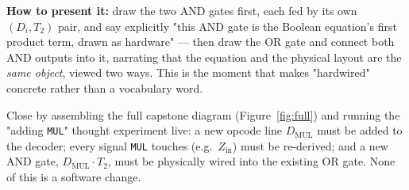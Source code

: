 \documentclass[11pt]{article}
\begin{document}
\textbf{How to present it:} draw the two AND gates first, each fed by its own $(D_i, T_2)$ pair, and say explicitly "this AND gate is the Boolean equation's first product term, drawn as hardware" --- then draw the OR gate and connect both AND outputs into it, narrating that the equation and the physical layout are the \emph{same object}, viewed two ways. This is the moment that makes "hardwired" concrete rather than a vocabulary word.

Close by assembling the full capstone diagram (Figure~\ref{fig:full}) and running the "adding \texttt{MUL}" thought experiment live: a new opcode line $D_{\text{MUL}}$ must be added to the decoder; every signal \texttt{MUL} touches (e.g.\ $Z_{\text{in}}$) must be re-derived; and a new AND gate, $D_{\text{MUL}} \cdot T_2$, must be physically wired into the existing OR gate. None of this is a software change.
\end{document}
